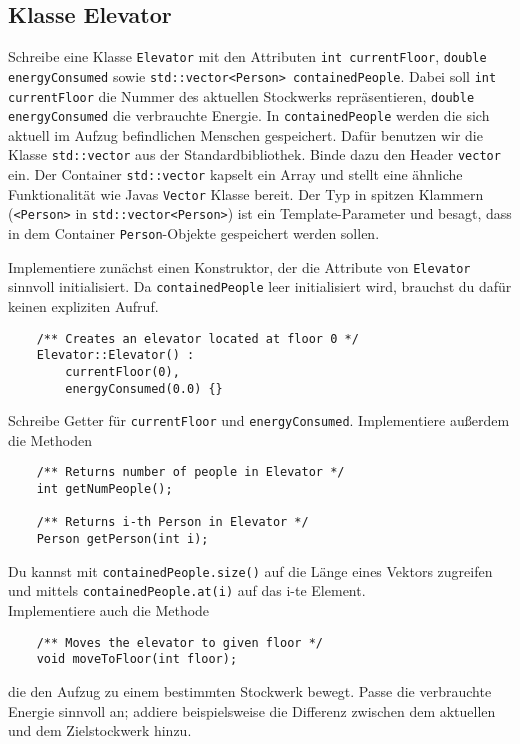 \subsection{Klasse Elevator}
Schreibe eine Klasse \texttt{Elevator} mit den Attributen \texttt{int currentFloor}, \texttt{double energyConsumed} sowie \texttt{std::vector<Person> containedPeople}.
Dabei soll \texttt{int currentFloor} die Nummer des aktuellen Stockwerks repräsentieren, \texttt{double energyConsumed} die verbrauchte Energie.
In \texttt{containedPeople} werden die sich aktuell im Aufzug befindlichen Menschen gespeichert.
Dafür benutzen wir die Klasse \texttt{std::vector} aus der Standardbibliothek.
Binde dazu den Header \texttt{vector} ein.
Der Container \texttt{std::vector} kapselt ein Array und stellt eine ähnliche Funktionalität wie Javas \texttt{Vector} Klasse bereit.
Der Typ in spitzen Klammern (\texttt{<Person>} in \texttt{std::vector<Person>}) ist ein Template-Parameter und besagt, dass in dem Container \texttt{Person}-Objekte gespeichert werden sollen.

Implementiere zunächst einen Konstruktor, der die Attribute von \texttt{Elevator} sinnvoll initialisiert.
Da \texttt{containedPeople} leer initialisiert wird, brauchst du dafür keinen expliziten Aufruf.

\begin{lstlisting}
    /** Creates an elevator located at floor 0 */
	Elevator::Elevator() :
	    currentFloor(0),
	    energyConsumed(0.0) {}
\end{lstlisting}

Schreibe Getter für \texttt{currentFloor} und \texttt{energyConsumed}.
Implementiere außerdem die Methoden
\begin{lstlisting}
	/** Returns number of people in Elevator */
	int getNumPeople();
	
	/** Returns i-th Person in Elevator */
	Person getPerson(int i);
\end{lstlisting}

Du kannst mit \texttt{containedPeople.size()} auf die Länge eines Vektors zugreifen und mittels \texttt{containedPeople.at(i)} auf das i-te Element. \\

Implementiere auch die Methode
\begin{lstlisting}
	/** Moves the elevator to given floor */
	void moveToFloor(int floor);
\end{lstlisting}

die den Aufzug zu einem bestimmten Stockwerk bewegt.
Passe die verbrauchte Energie sinnvoll an; addiere beispielsweise die Differenz zwischen dem aktuellen und dem Zielstockwerk hinzu.

